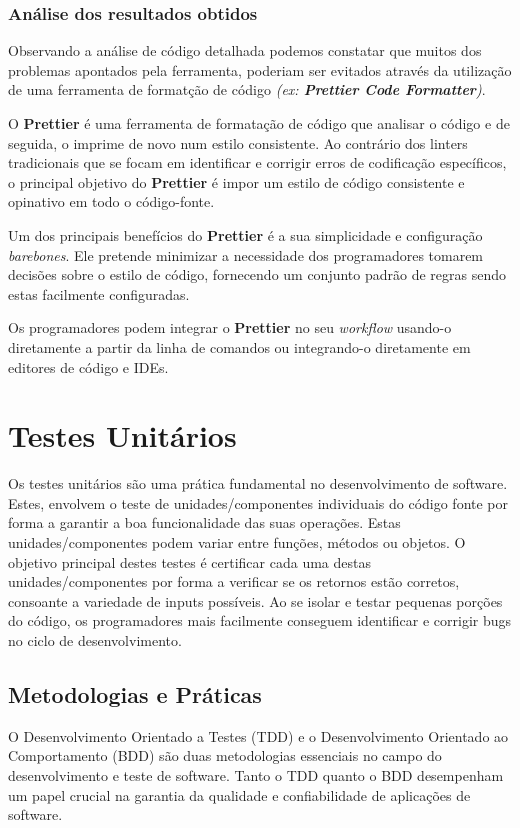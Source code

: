 \documentclass[a4paper,12pt]{article} %
\begin{document}
\newpage
\subsubsection{Análise dos resultados obtidos}
Observando a análise de código detalhada podemos constatar que muitos dos problemas apontados pela ferramenta, poderiam ser evitados através da utilização de uma ferramenta de formatção de código \textit{(ex: \textbf{Prettier Code Formatter})}.

\hfill

O \textbf{Prettier} é uma ferramenta de formatação de código que analisar o código e de seguida, o imprime de novo num estilo consistente. Ao contrário dos linters tradicionais que se focam em identificar e corrigir erros de codificação específicos, o principal objetivo do \textbf{Prettier} é impor um estilo de código consistente e opinativo em todo o código-fonte.

Um dos principais benefícios do \textbf{Prettier} é a sua simplicidade e configuração \textit{barebones}. Ele pretende minimizar a necessidade dos programadores tomarem decisões sobre o estilo de código, fornecendo um conjunto padrão de regras sendo estas facilmente configuradas.

Os programadores podem integrar o \textbf{Prettier} no seu \textit{workflow} usando-o diretamente a partir da linha de comandos ou integrando-o diretamente em editores de código e IDEs.

\newpage
\section{Testes Unitários}
Os testes unitários são uma prática fundamental no desenvolvimento de software. Estes, envolvem o teste de unidades/componentes individuais do código fonte por forma a garantir a boa funcionalidade das suas operações. Estas unidades/componentes podem variar entre funções, métodos ou objetos. O objetivo principal destes testes é certificar cada uma destas unidades/componentes por forma a verificar se os retornos estão corretos, consoante a variedade de inputs possíveis. Ao se isolar e testar pequenas porções do código, os programadores mais facilmente conseguem identificar e corrigir bugs no ciclo de desenvolvimento.

\subsection{Metodologias e Práticas}
O Desenvolvimento Orientado a Testes (TDD) e o Desenvolvimento Orientado ao Comportamento (BDD) são duas metodologias essenciais no campo do desenvolvimento e teste de software. Tanto o TDD quanto o BDD desempenham um papel crucial na garantia da qualidade e confiabilidade de aplicações de software.
\end{document}
